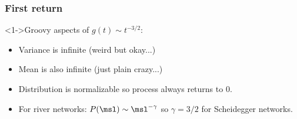 \begin{frame}[label=]
  \frametitle{First return}

  \begin{block}<1->{Groovy aspects of $g(t) \sim t^{-3/2}$:}
    \begin{itemize}
    \item<2-> Variance is infinite (weird but okay...)
    \item<3-> Mean is also infinite (just plain crazy...)
    \item<4-> Distribution is normalizable so process always returns to 0.
    \item<5-> For river networks: $P(\msl) \sim \msl^{-\gamma}$ so
      $\gamma = 3/2$ for Scheidegger networks.
    \end{itemize}
  \end{block}

\end{frame}
